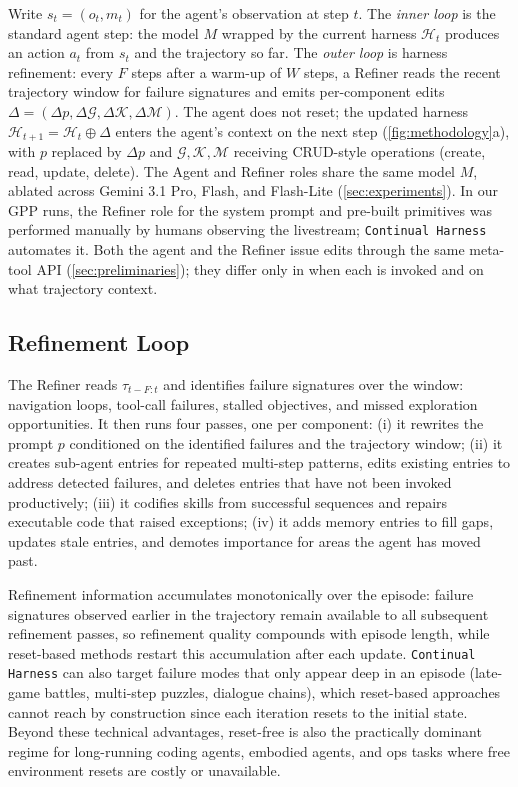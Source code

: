 \documentclass[11pt]{article}
\begin{document}
Write $s_t = (o_t, m_t)$ for the agent's observation at step $t$. The \emph{inner loop} is the standard agent step: the model $M$ wrapped by the current harness $\mathcal{H}_t$ produces an action $a_t$ from $s_t$ and the trajectory so far. The \emph{outer loop} is harness refinement: every $F$ steps after a warm-up of $W$ steps, a Refiner reads the recent trajectory window for failure signatures and emits per-component edits $\Delta = (\Delta p, \Delta\mathcal{G}, \Delta\mathcal{K}, \Delta\mathcal{M})$. The agent does not reset; the updated harness $\mathcal{H}_{t+1} = \mathcal{H}_t \oplus \Delta$ enters the agent's context on the next step (\cref{fig:methodology}a), with $p$ replaced by $\Delta p$ and $\mathcal{G}, \mathcal{K}, \mathcal{M}$ receiving CRUD-style operations (create, read, update, delete). The Agent and Refiner roles share the same model $M$, ablated across Gemini 3.1 Pro, Flash, and Flash-Lite (\cref{sec:experiments}). In our GPP runs, the Refiner role for the system prompt and pre-built primitives was performed manually by humans observing the livestream; \texttt{Continual Harness} automates it. Both the agent and the Refiner issue edits through the same meta-tool API (\cref{sec:preliminaries}); they differ only in when each is invoked and on what trajectory context.

\subsection{Refinement Loop}\label{sec:refinement}

The Refiner reads $\tau_{t-F:t}$ and identifies failure signatures over the window: navigation loops, tool-call failures, stalled objectives, and missed exploration opportunities. It then runs four passes, one per component: (i) it rewrites the prompt $p$ conditioned on the identified failures and the trajectory window; (ii) it creates sub-agent entries for repeated multi-step patterns, edits existing entries to address detected failures, and deletes entries that have not been invoked productively; (iii) it codifies skills from successful sequences and repairs executable code that raised exceptions; (iv) it adds memory entries to fill gaps, updates stale entries, and demotes importance for areas the agent has moved past.

Refinement information accumulates monotonically over the episode: failure signatures observed earlier in the trajectory remain available to all subsequent refinement passes, so refinement quality compounds with episode length, while reset-based methods restart this accumulation after each update. \texttt{Continual Harness} can also target failure modes that only appear deep in an episode (late-game battles, multi-step puzzles, dialogue chains), which reset-based approaches cannot reach by construction since each iteration resets to the initial state. Beyond these technical advantages, reset-free is also the practically dominant regime for long-running coding agents, embodied agents, and ops tasks where free environment resets are costly or unavailable.
\end{document}

